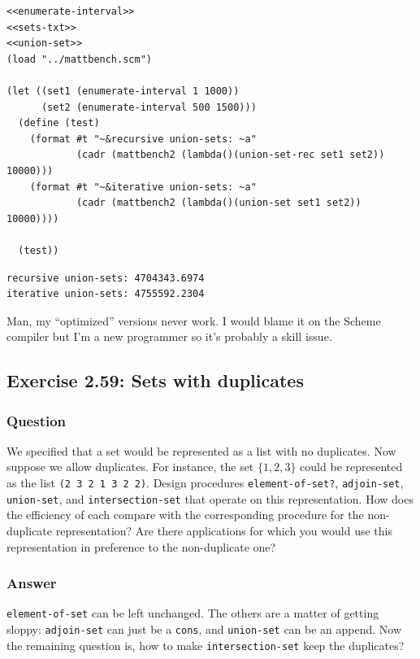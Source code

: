 \documentclass[final,fleqn,titlepage,twoside]{article}
\begin{document}
\begin{verbatim}
<<enumerate-interval>>
<<sets-txt>>
<<union-set>>
(load "../mattbench.scm")

(let ((set1 (enumerate-interval 1 1000))
      (set2 (enumerate-interval 500 1500)))
  (define (test)
    (format #t "~&recursive union-sets: ~a"
            (cadr (mattbench2 (lambda()(union-set-rec set1 set2)) 10000)))
    (format #t "~&iterative union-sets: ~a"
            (cadr (mattbench2 (lambda()(union-set set1 set2)) 10000))))

  (test))
\end{verbatim}

\begin{verbatim}
recursive union-sets: 4704343.6974
iterative union-sets: 4755592.2304
\end{verbatim}

Man, my ``optimized'' versions never work. I would blame it on the Scheme compiler
but I'm a new programmer so it's probably a skill issue.

\subsection{Exercise 2.59: Sets with duplicates}
\label{sec:org4d5185c}
\subsubsection{Question}
\label{sec:org9eff840}
We specified that a set would be represented as a list with no duplicates. Now
suppose we allow duplicates. For instance, the set \(\{1, 2, 3\}\) could be
represented as the list \texttt{(2 3 2 1 3 2 2)}. Design procedures
\texttt{element-of-set?}, \texttt{adjoin-set}, \texttt{union-set}, and
\texttt{intersection-set} that operate on this representation. How does the
efficiency of each compare with the corresponding procedure for the
non-duplicate representation? Are there applications for which you would use
this representation in preference to the non-duplicate one?

\subsubsection{Answer}
\label{sec:org55db441}
\texttt{element-of-set} can be left unchanged. The others are a matter of
getting sloppy: \texttt{adjoin-set} can just be a \texttt{cons}, and
\texttt{union-set} can be an append. Now the remaining question is, how to
make \texttt{intersection-set} keep the duplicates?
\end{document}
